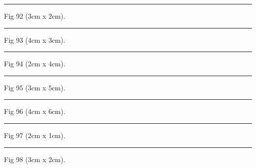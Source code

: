 \documentclass[a4paper,11pt]{article}
\begin{document}
\begin{swarmwrap}%
  \begin{minipage}[t]{3cm}
    \centering
    \rule{\linewidth}{2cm}
    {\footnotesize Fig 92 (3cm x 2cm).}
  \end{minipage}%
\end{swarmwrap}%
\swarmwrapnext
\lipsum[92]%

\begin{swarmwrap}%
  \begin{minipage}[t]{4cm}
    \centering
    \rule{\linewidth}{3cm}
    {\footnotesize Fig 93 (4cm x 3cm).}
  \end{minipage}%
\end{swarmwrap}%
\swarmwrapnext
\lipsum[93]%

\begin{swarmwrap}%
  \begin{minipage}[t]{2cm}
    \centering
    \rule{\linewidth}{4cm}
    {\footnotesize Fig 94 (2cm x 4cm).}
  \end{minipage}%
\end{swarmwrap}%
\swarmwrapnext
\lipsum[94]%

\begin{swarmwrap}%
  \begin{minipage}[t]{3cm}
    \centering
    \rule{\linewidth}{5cm}
    {\footnotesize Fig 95 (3cm x 5cm).}
  \end{minipage}%
\end{swarmwrap}%
\swarmwrapnext
\lipsum[95]%

\begin{swarmwrap}%
  \begin{minipage}[t]{4cm}
    \centering
    \rule{\linewidth}{6cm}
    {\footnotesize Fig 96 (4cm x 6cm).}
  \end{minipage}%
\end{swarmwrap}%
\swarmwrapnext
\lipsum[96]%

\begin{swarmwrap}%
  \begin{minipage}[t]{2cm}
    \centering
    \rule{\linewidth}{1cm}
    {\footnotesize Fig 97 (2cm x 1cm).}
  \end{minipage}%
\end{swarmwrap}%
\swarmwrapnext
\lipsum[97]%

\begin{swarmwrap}%
  \begin{minipage}[t]{3cm}
    \centering
    \rule{\linewidth}{2cm}
    {\footnotesize Fig 98 (3cm x 2cm).}
  \end{minipage}%
\end{swarmwrap}%
\swarmwrapnext
\lipsum[98]%
\end{document}
